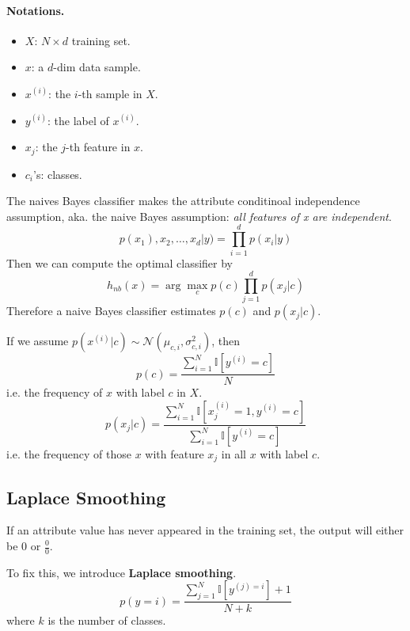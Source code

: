         \paragraph{Notations.}
            \begin{itemize}
                \item $X$: $N \times d$ training set. 
                \item $x$: a $d$-dim data sample.
                \item $x^{(i)}$: the $i$-th sample in $X$.
                \item $y^{(i)}$: the label of $x^{(i)}$.
                \item $x_j$: the $j$-th feature in $x$.
                \item $c_i$'s: classes.
            \end{itemize}
        The naives Bayes classifier makes the attribute conditinoal independence assumption, aka. the naive Bayes assumption: \emph{all features of x are independent}.
        \[ p(x_1), x_2,\dots,x_d | y) = \prod_{i=1}^d p(x_i|y) \]
        Then we can compute the optimal classifier by
        \[ h_{nb}(x) = \arg\max_{c}p(c)\prod_{j=1}^d p(x_j|c) \]
        Therefore a naive Bayes classifier estimates $p(c)$ and $p(x_j|c)$.

        If we assume $p(x^{(i)}|c) \sim \mathcal{N}(\mu_{c,i}, \sigma^2_{c,i})$, then
        \[ p(c) = \frac{\sum_{i=1}^N\mathbb{I}[y^{(i)}=c]}{N} \]
        i.e. the frequency of $x$ with label $c$ in $X$.
        \[ p(x_j|c) = \frac{\sum_{i=1}^N\mathbb{I}[x^{(i)}_j = 1, y^{(i)}=c]}{\sum_{i=1}^N\mathbb{I}[y^{(i)}=c]} \]
        i.e. the frequency of those $x$ with feature $x_j$ in all $x$ with label $c$.

    \subsection{Laplace Smoothing}
        If an attribute value has never appeared in the training set, the output will either be $0$ or $\frac{0}{0}$.

        To fix this, we introduce \textbf{Laplace smoothing}.
        \[ p(y=i) = \frac{\sum_{j=1}^N\mathbb{I}[y^{(j)=i}] + 1}{N + k} \]
        where $k$ is the number of classes.